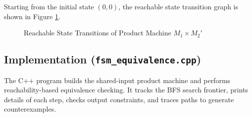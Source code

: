 \documentclass[12pt,a4paper]{article}
\begin{document}
Starting from the initial state $(0,0)$, the reachable state transition graph is shown in Figure \ref{fig:prod_case2}.

\begin{figure}[h!]
    \centering
    \caption{Reachable State Transitions of Product Machine $M_1 \times M_2'$}
    \label{fig:prod_case2}
\end{figure}

\subsection{Implementation (\texttt{fsm\_equivalence.cpp})}
The C++ program builds the shared-input product machine and performs reachability-based equivalence checking. It tracks the BFS search frontier, prints details of each step, checks output constraints, and traces paths to generate counterexamples.
\end{document}
